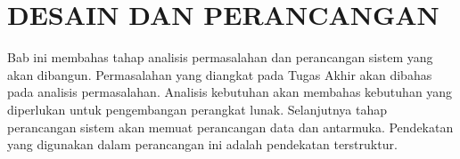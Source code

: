 \chapter{DESAIN DAN PERANCANGAN}
  Bab ini membahas tahap analisis permasalahan dan perancangan sistem yang akan dibangun. Permasalahan yang diangkat pada Tugas Akhir akan dibahas pada analisis permasalahan. Analisis kebutuhan akan membahas kebutuhan yang diperlukan untuk pengembangan perangkat lunak. Selanjutnya tahap perancangan sistem akan memuat perancangan data dan antarmuka. Pendekatan yang digunakan dalam perancangan ini adalah pendekatan terstruktur. 
  
  
  
  \pagebreak
  
  
  \pagebreak
  
  
  
